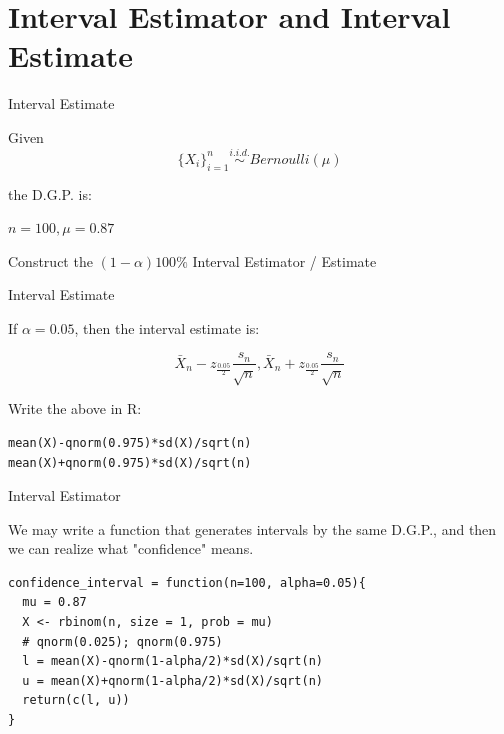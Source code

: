 \documentclass[12pt]{beamer}
\begin{document}
\section{Interval Estimator and Interval Estimate}


\begin{frame}[fragile]{Interval Estimate}

Given
$$\{X_i\}_{i=1}^n \stackrel{i.i.d.}{\sim} Bernoulli(\mu)$$

the D.G.P. is:

$n=100, \mu = 0.87$

Construct the $(1-\alpha)100\%$ Interval Estimator / Estimate

\end{frame}


\begin{frame}[fragile]{Interval Estimate}

If $\alpha = 0.05$, then the interval estimate is:

$$ \bar{X}_n - z_{\frac{0.05}{2}} \frac{s_n}{\sqrt{n}}, \bar{X}_n + z_{\frac{0.05}{2}} \frac{s_n}{\sqrt{n}} $$

Write the above in R:

\begin{verbatim}
mean(X)-qnorm(0.975)*sd(X)/sqrt(n)
mean(X)+qnorm(0.975)*sd(X)/sqrt(n)
\end{verbatim}

\end{frame}


\begin{frame}[fragile]{Interval Estimator}

We may write a function that generates intervals by the same D.G.P., and then we can realize what "confidence" means.

\begin{verbatim}
confidence_interval = function(n=100, alpha=0.05){
  mu = 0.87
  X <- rbinom(n, size = 1, prob = mu)
  # qnorm(0.025); qnorm(0.975)
  l = mean(X)-qnorm(1-alpha/2)*sd(X)/sqrt(n)
  u = mean(X)+qnorm(1-alpha/2)*sd(X)/sqrt(n)
  return(c(l, u))
}\end{verbatim}

\end{frame}
\end{document}
